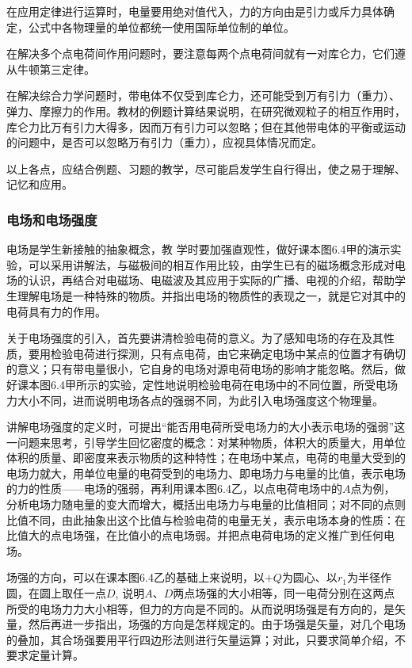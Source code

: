 在应用定律进行运算时，电量要用绝对值代入，力的方向由是引力或斥力具体确定，公式中各物理量的单位都统一使用国际单位制的单位。

在解决多个点电荷间作用问题时，要注意每两个点电荷间就有一对库仑力，它们遵从牛顿第三定律。

在解决综合力学问题时，带电体不仅受到库仑力，还可能受到万有引力（重力）、弹力、摩擦力的作用。教材的例题计算结果说明，在研究微观粒子的相互作用时，库仑力比万有引力大得多，因而万有引力可以忽略；但在其他带电体的平衡或运动的问题中，是否可以忽略万有引力（重力），应视具体情况而定。

以上各点，应结合例题、习题的教学，尽可能启发学生自行得出，使之易于理解、记忆和应用。

\subsubsection{电场和电场强度}

电场是学生新接触的抽象概念，教
学时要加强直观性，做好课本图6.4甲的演示实验，可以采用讲解法，与磁极间的相互作用比较，由学生已有的磁场概念形成对电场的认识，再结合对电磁场、电磁波及其应用于实际的广播、电视的介绍，帮助学生理解电场是一种特殊的物质。并指出电场的物质性的表现之一，就是它对其中的电荷具有力的作用。

关于电场强度的引入，首先要讲清检验电荷的意义。为了感知电场的存在及其性质，要用检验电荷进行探测，只有点电荷，由它来确定电场中某点的位置才有确切的意义；只有带电量很小，它自身的电场对源电荷电场的影响才能忽略。然后，做好课本图6.4甲所示的实验，定性地说明检验电荷在电场中的不同位置，所受电场力大小不同，进而说明电场各点的强弱不同，为此引入电场强度这个物理量。

讲解电场强度的定义时，可提出“能否用电荷所受电场力的大小表示电场的强弱”这一问题来思考，引导学生回忆密度的概念：对某种物质，体积大的质量大，用单位体积的质量、即密度来表示物质的这种特性；在电场中某点，电荷的电量大受到的电场力就大，用单位电量的电荷受到的电场力、即电场力与电量的比值，表示电场的力的性质——电场的强弱，再利用课本图6.4乙，以点电荷电场中的$A$点为例，分析电场力随电量的变大而增大，概括出电场力与电量的比值相同；对不同的点则比值不同，由此抽象出这个比值与检验电荷的电量无关，表示电场本身的性质：在比值大的点电场强，在比值小的点电场弱。并把点电荷电场的定义推广到任何电场。

场强的方向，可以在课本图6.4乙的基础上来说明，以$+Q$为圆心、以$r_1$为半径作圆，在圆上取任一点$D$, 说明$A$、$D$两点场强的大小相等，同一电荷分别在这两点所受的电场力力大小相等，但力的方向是不同的。从而说明场强是有方向的，是矢量，然后再进一步指出，场强的方向是怎样规定的。由于场强是矢量，对几个电场的叠加，其合场强要用平行四边形法则进行矢量运算；对此，只要求简单介绍，不要求定量计算。


